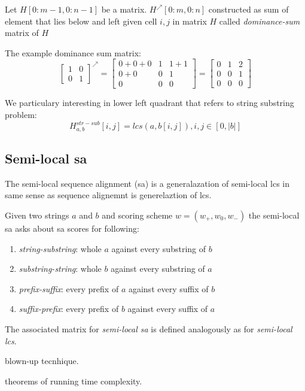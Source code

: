 \begin{definition}
\begin{definition}
Let $H[0:m-1,0:n-1]$  be a matrix.
$H^{\nearrow}[0:m,0:n]$ constructed as sum of element that lies below and left given cell $i,j$ in matrix $H$ called \emph{dominance-sum} matrix of $H$
\end{definition}

The example dominance sum matrix:
\begin{equation}
\begin{bmatrix}
1 & 0  \\
0 & 1 
\end{bmatrix}^{\nearrow} =
\begin{bmatrix}
0+0+0 & 1 & 1+1 \\
0+0 & 0 & 1 \\
0 & 0 & 0
\end{bmatrix} =
\begin{bmatrix}
0 & 1 & 2 \\
0 & 0 & 1 \\
0 & 0 & 0
\end{bmatrix}
\end{equation}



We particulary interesting in lower left quadrant that refers to string substring problem:
\begin{equation}
H_{a,b}^{str-sub}[i,j] = lcs(a,b[i,j]),i,j \in [0,|b|] 
\end{equation}

\subsection{Semi-local sa}
The semi-local sequence alignment (sa) is a generalazation of semi-local lcs in same sense as sequence alignemnt is generelaztion of lcs.

Given two strings $a$ and $b$ and scoring scheme $w=(w_{+},w_{0},w_{-})$  the semi-local sa  asks about
sa scores for following:
\begin{enumerate}
\item \emph{string-substring}: whole $a$ against every substring of $b$
\item \emph{substring-string}: whole $b$ against every substring of $a$
\item \emph{prefix-suffix}: every prefix of $a$ against every suffix of $b$
\item \emph{suffix-prefix}: every prefix of $b$ against every suffix of $a$
\end{enumerate} 

The associated matrix for \emph{semi-local sa} is defined analogously as for \emph{semi-local lcs}.



blown-up tecnhique.

theorems of running time complexity.

 





\end{definition}

